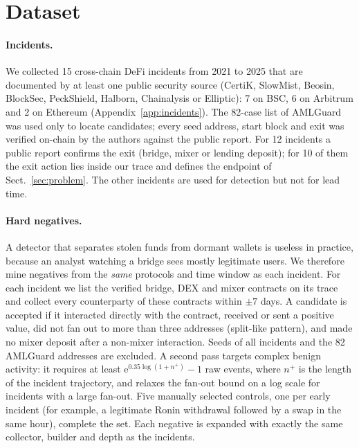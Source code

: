 \section{Dataset}
\label{sec:data}

\paragraph{Incidents.}
We collected 15 cross-chain DeFi incidents from 2021 to 2025 that are documented by at least one public security source (CertiK, SlowMist, Beosin, BlockSec, PeckShield, Halborn, Chainalysis or Elliptic): 7 on BSC, 6 on Arbitrum and 2 on Ethereum (Appendix~\ref{app:incidents}).
The 82-case list of AMLGuard~\cite{wu2026amlguard} was used only to locate candidates; every seed address, start block and exit was verified on-chain by the authors against the public report.
For 12 incidents a public report confirms the exit (bridge, mixer or lending deposit); for 10 of them the exit action lies inside our trace and defines the endpoint of Sect.~\ref{sec:problem}. The other incidents are used for detection but not for lead time.

\paragraph{Hard negatives.}
A detector that separates stolen funds from dormant wallets is useless in practice, because an analyst watching a bridge sees mostly legitimate users.
We therefore mine negatives from the \emph{same} protocols and time window as each incident.
For each incident we list the verified bridge, DEX and mixer contracts on its trace and collect every counterparty of these contracts within $\pm7$ days.
A candidate is accepted if it interacted directly with the contract, received or sent a positive value, did not fan out to more than three addresses (split-like pattern), and made no mixer deposit after a non-mixer interaction.
Seeds of all incidents and the 82 AMLGuard addresses are excluded.
A second pass targets complex benign activity: it requires at least $\mathrm{e}^{0.35\log(1+n^+)}-1$ raw events, where $n^+$ is the length of the incident trajectory, and relaxes the fan-out bound on a log scale for incidents with a large fan-out.
Five manually selected controls, one per early incident (for example, a legitimate Ronin withdrawal followed by a swap in the same hour), complete the set.
Each negative is expanded with exactly the same collector, builder and depth as the incidents.

